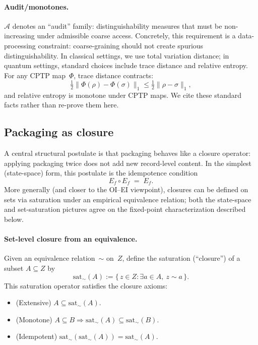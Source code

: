 \paragraph{Audit/monotones.}
$\mathcal{A}$ denotes an ``audit'' family: distinguishability measures that must be non-increasing under admissible coarse access. Concretely, this requirement is a data-processing constraint:
coarse-graining should not create spurious distinguishability. In classical settings, we use total variation distance; in quantum settings, standard choices include trace distance and relative entropy. For any CPTP map~$\Phi$, trace distance contracts:
\[
\tfrac12\|\Phi(\rho)-\Phi(\sigma)\|_1 \le \tfrac12\|\rho-\sigma\|_1,
\]
and relative entropy is monotone under CPTP maps.\cite{NielsenChuang2010QCQI,Lindblad1975EntropyIneq} We cite these standard facts rather than re-prove them here.

\subsection{Packaging as closure}

A central structural postulate is that packaging behaves like a closure operator: applying packaging twice does not add new record-level content.
In the simplest (state-space) form, this postulate is the idempotence condition
\[
E_f \circ E_f \;=\; E_f.
\]
More generally (and closer to the OI--EI viewpoint), closures can be defined on sets via saturation under an empirical equivalence relation; both the state-space and set-saturation pictures agree on the fixed-point characterization described below.

\paragraph{Set-level closure from an equivalence.}
Given an equivalence relation~$\sim$ on~$Z$, define the saturation (``closure'') of a subset $A\subseteq Z$ by
\[
\mathrm{sat}_\sim(A) := \{\, z\in Z : \exists a\in A,\ z\sim a \,\}.
\]
This saturation operator satisfies the closure axioms:
\begin{itemize}
  \item (Extensive) $A \subseteq \mathrm{sat}_\sim(A)$.
  \item (Monotone) $A\subseteq B \Rightarrow \mathrm{sat}_\sim(A)\subseteq \mathrm{sat}_\sim(B)$.
  \item (Idempotent) $\mathrm{sat}_\sim(\mathrm{sat}_\sim(A)) = \mathrm{sat}_\sim(A)$.
\end{itemize}
